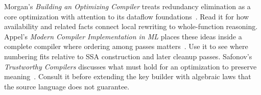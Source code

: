 Morgan's \emph{Building an Optimizing Compiler} treats redundancy elimination as a core optimization with attention to its dataflow foundations~\cite{morgan-1998-optimizing}.
Read it for how availability and related facts connect local rewriting to whole-function reasoning.
Appel's \emph{Modern Compiler Implementation in ML} places these ideas inside a complete compiler where ordering among passes matters~\cite{appel-1998-modern}.
Use it to see where numbering fits relative to SSA construction and later cleanup passes.
Safonov's \emph{Trustworthy Compilers} discusses what must hold for an optimization to preserve meaning~\cite{safonov-2010-trustworthy}.
Consult it before extending the key builder with algebraic laws that the source language does not guarantee.
